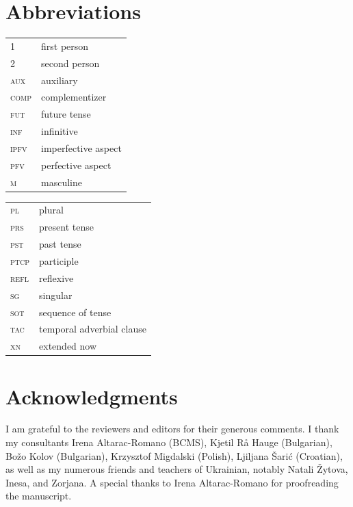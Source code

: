 \documentclass[output=paper,colorlinks,citecolor=brown]{langscibook}
\begin{document}




\section*{Abbreviations}

\begin{tabularx}{.5\textwidth}{@{}lQ}
\textsc{1}&first person\\
\textsc{2}&second person\\
\textsc{aux}&auxiliary\\
\textsc{comp}&complementizer\\
\textsc{fut}&future tense\\
\textsc{inf}&infinitive\\
\textsc{ipfv}&imperfective aspect\\
\textsc{pfv}&perfective aspect\\
\textsc{m}&masculine\\
\end{tabularx}%
\begin{tabularx}{.5\textwidth}{lQ@{}}
\textsc{pl}&plural\\
\textsc{prs}&present tense\\
\textsc{pst}&past tense\\
\textsc{ptcp}&participle\\
\textsc{refl}&reflexive\\
\textsc{sg}&singular\\
\textsc{sot}&sequence of tense\\
\textsc{tac}&temporal adverbial clause\\
\textsc{xn}&extended now\\
\end{tabularx}

\section*{Acknowledgments}
I am grateful to the reviewers and editors for their generous comments. I thank my consultants Irena Altarac-Romano (BCMS), Kjetil Rå Hauge (Bulgarian), Božo Kolov (Bulgarian), Krzysztof Migdalski (Polish), Ljiljana Šarić (Croatian), as well as my numerous friends and teachers of Ukrainian, notably Natali Žytova, Inesa, and Zorjana. A special thanks to Irena Altarac-Romano for proofreading the manuscript.

\sloppy
\printbibliography[heading=subbibliography,notkeyword=this]
\end{document}
